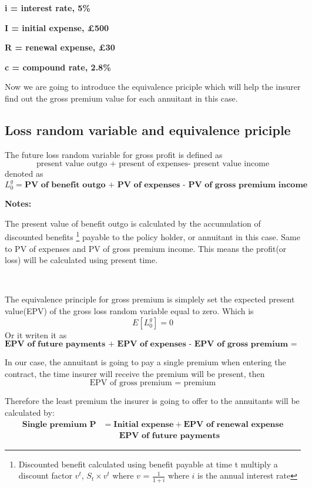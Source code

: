 \documentclass{report}
\begin{document}
\textbf{i = interest rate, 5\%}

\textbf{I = initial expense, \pounds500}

\textbf{R = renewal expense, \pounds30}

\textbf{c = compound rate, 2.8\%}


Now we are going to introduce the equivalence priciple which will help the insurer find out the gross premium value for each annuitant in this case.



\subsection{Loss random variable and equivalence priciple}

The future loss random variable for gross profit is defined as 
\[
\text{present value outgo + present of expenses- present value income}
\]
denoted as
\[
\textbf{$L_0^g$} = \textbf{PV of benefit outgo + PV of expenses - PV of gross premium income}
\]

\textbf{Notes:}

The present value of benefit outgo is calculated by the accumulation of discounted benefits \footnote{Discounted benefit calculated using benefit payable at time t multiply a discount factor $v^t$, $S_t \times v^t$ where $v$ = $\frac{1}{1+i}$ where $i$ is the annual interest rate} payable to the policy holder, or annuitant in this case. Same to PV of expenses and PV of gross premium income. This means the profit(or loss) will be calculated using present time.

 \



The equivalence principle for gross premium is simplely set the expected present value(EPV) of the gross loss random variable equal to zero. Which is
\[
E[L_0^g] = 0
\]
Or it writen it as
\[
\textbf{EPV\ of\ future\ payments + EPV\ of\ expenses - EPV\ of\ gross\ premium = 0}
\]

In our case, the annuitant is going to pay a single premium when entering the contract, the time insurer will receive the premium will be present, then 
\[
\text{EPV of gross premium = premium}
\]

Therefore the least premium the insurer is going to offer to the annuitants will be calculated by:
\begin{align}
\textbf{Single premium P} &= \textbf{Initial expense} + \textbf{EPV of renewal expense}  \nonumber \\
 &\qquad {} \textbf{EPV of future payments}
\end{align}
\end{document}
